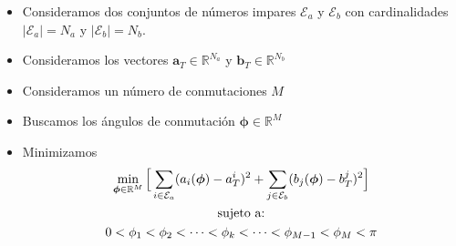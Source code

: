 
\begin{frame}
    \frametitle{}
    \begin{problem}
        \begin{itemize}
            \item Consideramos dos conjuntos de números impares $\mathcal{E}_a$ y $\mathcal{E}_b$ con cardinalidades $|\mathcal{E}_a| = N_a$ y  $|\mathcal{E}_b| = N_b$.
            \item Consideramos los vectores $\bm{a}_T  \in \mathbb{R}^{N_a}$ y $\bm{b}_T  \in \mathbb{R}^{N_b}$
            \item Consideramos un número de conmutaciones $M$
            \item Buscamos los ángulos de conmutación $\bm{\phi} \in \mathbb{R}^M$
            \item Minimizamos
        \begin{gather}
            \min_{\bm{\phi} \in \mathbb{R}^M} \Big[
            \sum_{i \in \mathcal{E}_a} (a_i(\bm{\phi}) - a^i_T)^2 + 
            \sum_{j \in \mathcal{E}_b} (b_j(\bm{\phi}) - b^j_T)^2  
            \Big] \\
            \notag \text{sujeto a:} \\ 
            \notag    0 < \phi_1  < \phi_2 < \dots  < \phi_k < \dots < \phi_{M-1}  <   \phi_{M} < \pi
            \label{constraints}
        \end{gather} 
    \end{itemize}
\end{problem}

\end{frame}


